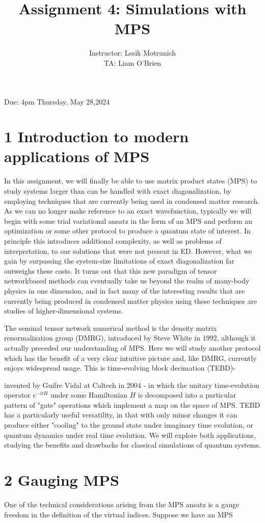 \documentclass[12pt]{article}
\title{Assignment 4: Simulations with MPS }
\author{Instructor: Lesik Motrunich\\
TA: Liam O'Brien}
\date{}
\begin{document}
\maketitle
Due: $4 \mathrm{pm}$ Thursday, May 28,2024

\section*{1 Introduction to modern applications of MPS}
In this assignment, we will finally be able to use matrix product states (MPS) to study systems larger than can be handled with exact diagonalization, by employing techniques that are currently being used in condensed matter research. As we can no longer make reference to an exact wavefunction, typically we will begin with some trial variational ansatz in the form of an MPS and perform an optimization or some other protocol to produce a quantum state of interest. In principle this introduces additional complexity, as well as problems of interpretation, to our solutions that were not present in ED. However, what we gain by surpassing the system-size limitations of exact diagonalization far outweighs these costs. It turns out that this new paradigm of tensor networkbased methods can eventually take us beyond the realm of many-body physics in one dimension, and in fact many of the interesting results that are currently being produced in condensed matter physics using these techniques are studies of higher-dimensional systems.

The seminal tensor network numerical method is the density matrix renormalization group (DMRG), introduced by Steve White in 1992, although it actually preceded our understanding of MPS. Here we will study another protocol which has the benefit of a very clear intuitive picture and, like DMRG, currently enjoys widespread usage. This is time-evolving block decimation (TEBD)-

invented by Guifre Vidal at Caltech in 2004 - in which the unitary time-evolution operator $e^{-i t H}$ under some Hamiltonian $H$ is decomposed into a particular pattern of "gate" operations which implement a map on the space of MPS. TEBD has a particularly useful versatility, in that with only minor changes it can produce either "cooling" to the ground state under imaginary time evolution, or quantum dynamics under real time evolution. We will explore both applications, studying the benefits and drawbacks for classical simulations of quantum systems.

\section*{2 Gauging MPS}
One of the technical considerations arising from the MPS ansatz is a gauge freedom in the definition of the virtual indices. Suppose we have an MPS
\end{document}
